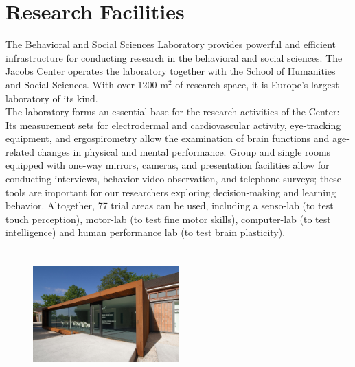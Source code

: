 \section{Research Facilities} 

The Behavioral and Social Sciences Laboratory provides powerful and efficient infrastructure for conducting research in the behavioral and social sciences. The Jacobs Center operates the laboratory together with the School of Humanities and Social Sciences. With over 1200 m$^{2}$ of research space, it is Europe's largest laboratory of its kind. 
\\
The laboratory forms an essential base for the research activities of the Center:
Its measurement sets for electrodermal and cardiovascular activity, eye-tracking equipment, and ergospirometry allow the examination of brain functions and age-related changes in physical and mental performance. Group and single rooms equipped with one-way mirrors, cameras, and presentation facilities allow for conducting interviews, behavior video observation, and telephone surveys; these tools are important for our researchers exploring decision-making and learning behavior. Altogether, 77 trial areas can be used, including a senso-lab (to test touch perception), motor-lab (to test fine motor skills), computer-lab (to test intelligence) and human performance lab (to test brain plasticity). 

\begin{figure}[htbp]
	\begin{center}
		\includegraphics[width=0.5\textwidth,height=5cm]{photo2.jpg}
	\end{center}
\end{figure}


